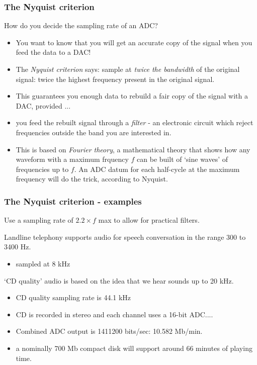 \documentclass[10pt]{beamer}
\begin{document}
\begin{frame}
\frametitle{The Nyquist criterion}
How do you decide the sampling rate of an ADC?
\begin{itemize}
\item You want to know that you will get an accurate copy of the signal when you feed the data to a DAC!
\item The \emph{Nyquist criterion} says: sample at \emph{twice the bandwidth} of the original signal: twice the highest frequency present in the original signal.
\item This guarantees you enough data to rebuild a fair copy of the signal with a DAC, provided ...
\item you feed the rebuilt signal through a \emph{filter} - an electronic circuit which reject frequencies outside the band you are interested in.
\item This is based on \emph{Fourier theory}, a mathematical theory that shows how any waveform with a maximum frquency $f$ can be built of `sine waves' of frequencies up to $f$. An ADC datum for each half-cycle at the maximum frequency will do the trick, according to Nyquist.
\end{itemize}
\end{frame}

\begin{frame}
\frametitle{The Nyquist criterion - examples}
Use a sampling rate of $2.2 \times f$ max to allow for practical filters.

Landline telephony supports audio for speech conversation in the range 300 to 3400 Hz. 
\begin{itemize}
\item sampled at 8 kHz
\end{itemize}

`CD quality' audio is based on the idea that we hear sounds up to 20 kHz.
\begin{itemize}
\item CD quality sampling rate is 44.1 kHz
\item CD is recorded in stereo and each channel uses a 16-bit ADC....
\item Combined ADC output is 1411200 bits/sec: 10.582 Mb/min.
\item a nominally 700 Mb compact disk will support around 66 minutes of playing time.
\end{itemize}
\end{frame}
\end{document}
